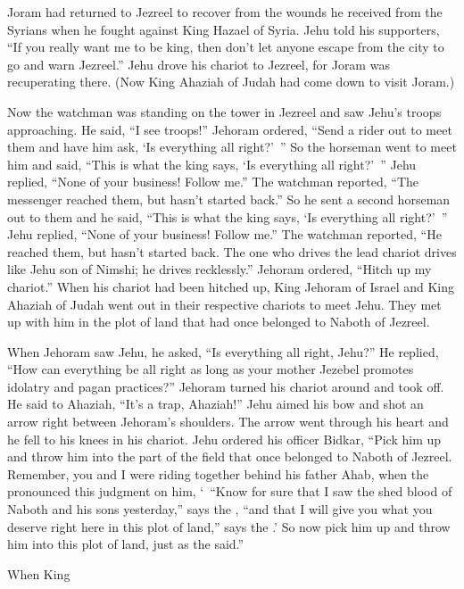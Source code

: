 {Joram
had returned
to Jezreel
to recover
from
the wounds
he received
from the Syrians
when he fought
against King
Hazael
of Syria.
Jehu
told
his supporters, “If
you really
want
me to be king, then
don’t
let anyone
escape
from
the city
to go
and warn
Jezreel.”
Jehu
drove
his chariot
to Jezreel,
for
Joram
was recuperating
there.
(Now King
Ahaziah
of Judah
had come down
to visit
Joram.)
\par }{\PP {}Now the watchman
was standing
on
the tower
in Jezreel
and saw
Jehu’s
troops
approaching.
He said,
“I
see
troops!” Jehoram
ordered, “Send
a rider
out to meet
them and have him ask,
‘Is everything all right?’ ”
So
the horseman
went to meet
him and said,
“This is what
the king
says,
‘Is everything all right?’ ” Jehu
replied,
“None of your business! Follow
me.” The watchman
reported,
“The messenger
reached
them,
but hasn’t
started back.”
So he sent
a second
horseman
out
to
them and he said,
“This is what
the king
says,
‘Is everything all right?’ ” Jehu
replied,
“None of your business! Follow me.”
The watchman
reported,
“He reached
them, but hasn’t
started back.
The one who drives
the lead chariot drives
like Jehu
son
of Nimshi;
he drives
recklessly.”
Jehoram
ordered,
“Hitch up
my chariot.”
When his chariot had been hitched up,
King
Jehoram
of Israel
and King
Ahaziah
of Judah
went out
in their respective
chariots
to meet
Jehu.
They met up
with him in the plot of land
that had once belonged to Naboth
of Jezreel.
\par }{\PP {}When
Jehoram
saw
Jehu,
he asked,
“Is everything all right,
Jehu?” He replied,
“How
can everything be all right
as long as
your mother
Jezebel
promotes idolatry
and pagan practices?”
Jehoram
turned
his chariot around and took off.
He said
to
Ahaziah,
“It’s a trap,
Ahaziah!”
Jehu
aimed
his bow
and shot
an arrow right between
Jehoram’s
shoulders. The arrow
went
through his heart
and he fell to his knees
in his chariot.
Jehu ordered
his officer
Bidkar,
“Pick
him up
and throw
him into the part
of the field
that
once belonged to Naboth
of Jezreel.
Remember,
you
and I
were riding
together behind
his father
Ahab,
when the
{}
pronounced
this
judgment on him,
‘ “Know for sure
that I saw
the
shed
blood
of Naboth
and his sons
yesterday,”
says
the {}, “and that I will give
you what
you deserve
right here in this
plot
of land,” says
the {}.’ So now
pick
him up and throw
him into this plot
of land, just
as the
{} said.”
\par }{\PP {}When King
}
